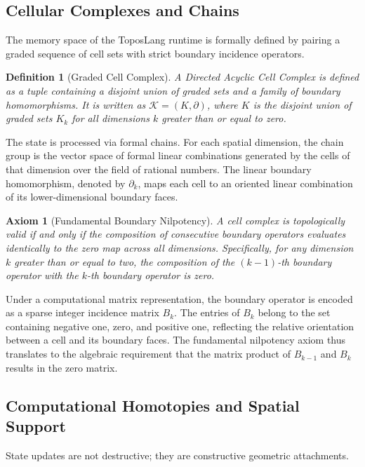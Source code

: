 \documentclass[11pt, a4paper]{article}
\newtheorem{definition}[theorem]{Definition}
\newtheorem{axiom}[theorem]{Axiom}
\begin{document}
\subsection{Cellular Complexes and Chains}

The memory space of the ToposLang runtime is formally defined by pairing a graded sequence of cell sets with strict boundary incidence operators.

\begin{definition}[Graded Cell Complex]
A Directed Acyclic Cell Complex is defined as a tuple containing a disjoint union of graded sets and a family of boundary homomorphisms. It is written as $\mathcal{K} = (K, \partial)$, where $K$ is the disjoint union of graded sets $K_k$ for all dimensions $k$ greater than or equal to zero. 
\end{definition}

The state is processed via formal chains. For each spatial dimension, the chain group is the vector space of formal linear combinations generated by the cells of that dimension over the field of rational numbers. The linear boundary homomorphism, denoted by $\partial_k$, maps each cell to an oriented linear combination of its lower-dimensional boundary faces.

\begin{axiom}[Fundamental Boundary Nilpotency]
A cell complex is topologically valid if and only if the composition of consecutive boundary operators evaluates identically to the zero map across all dimensions. Specifically, for any dimension $k$ greater than or equal to two, the composition of the $(k-1)$-th boundary operator with the $k$-th boundary operator is zero.
\end{axiom}

Under a computational matrix representation, the boundary operator is encoded as a sparse integer incidence matrix $B_k$. The entries of $B_k$ belong to the set containing negative one, zero, and positive one, reflecting the relative orientation between a cell and its boundary faces. The fundamental nilpotency axiom thus translates to the algebraic requirement that the matrix product of $B_{k-1}$ and $B_k$ results in the zero matrix.

\subsection{Computational Homotopies and Spatial Support}

State updates are not destructive; they are constructive geometric attachments.
\end{document}
